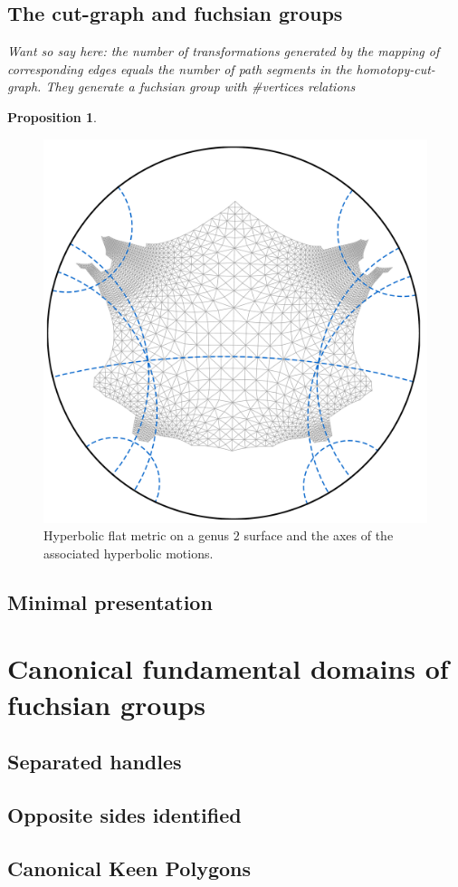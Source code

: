 \documentclass{book}
\newtheorem{proposition}{Proposition}
\begin{document}
\subsection{The cut-graph and fuchsian groups}
\emph{Want so say here: the number of transformations generated by the mapping of corresponding edges equals the number of path segments in the homotopy-cut-graph. They generate a fuchsian group with \#vertices relations}

\begin{proposition}
	
\end{proposition}

\begin{figure}
\centering
\includegraphics[width=0.4\linewidth]{cutCuttedBrezel01}
\caption{Hyperbolic flat metric on a genus $2$ surface and the axes of the associated hyperbolic motions.}
\label{fig:axes_of_motion}
\end{figure}

\subsection{Minimal presentation}

\section{Canonical fundamental domains of fuchsian groups}
\subsection{Separated handles}
\subsection{Opposite sides identified}
\subsection{Canonical Keen Polygons}
\end{document}
